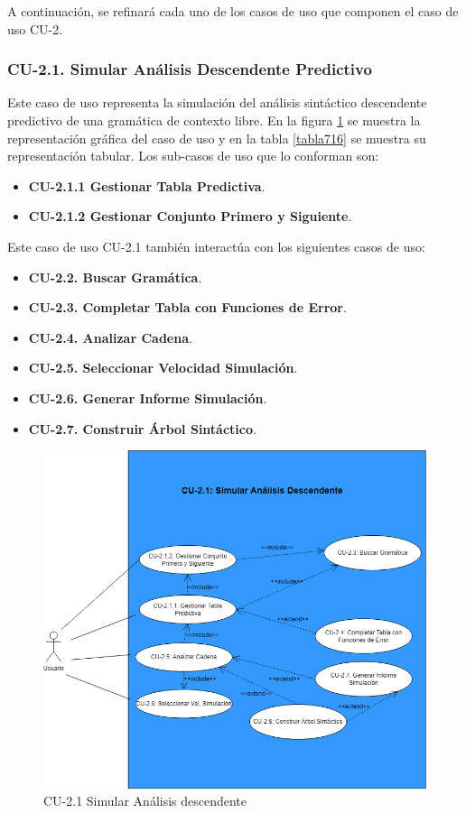  A continuación, se refinará cada uno de los casos de uso que componen el caso de uso CU-2.

 \subsubsection{CU-2.1. Simular Análisis Descendente Predictivo}

 Este caso de uso representa la simulación del análisis sintáctico descendente predictivo de una gramática de contexto libre. En la figura \ref{fig:CU21} se muestra la representación gráfica del caso de uso y en la  tabla \ref{tabla716} se muestra su representación tabular. Los sub-casos de uso que lo conforman son:

 \begin{itemize}
  \item \textbf{CU-2.1.1 Gestionar Tabla Predictiva}.
  \item \textbf{CU-2.1.2 Gestionar Conjunto Primero y Siguiente}.
 \end{itemize}

Este caso de uso CU-2.1 también interactúa con los siguientes casos de uso:
 \begin{itemize}
  \item \textbf{CU-2.2. Buscar Gramática}.
  \item \textbf{CU-2.3. Completar Tabla con Funciones de Error}.
  \item \textbf{CU-2.4. Analizar Cadena}.
  \item \textbf{CU-2.5. Seleccionar Velocidad Simulación}.
  \item \textbf{CU-2.6. Generar Informe Simulación}.
  \item \textbf{CU-2.7. Construir Árbol Sintáctico}.
 \end{itemize}


  \begin{figure}[H]
       \begin{center} 
 	\includegraphics[scale=0.55]{figuras/Cap7/CU21.png}
 	\caption{CU-2.1 Simular Análisis descendente}
 	\label{fig:CU21}
       \end{center}
   \end{figure}
  

